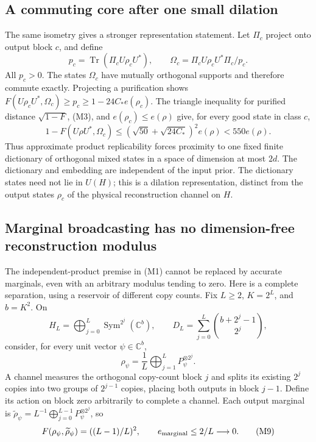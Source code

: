\documentclass[11pt]{article}
\newcommand{\Tr}{\operatorname{Tr}}
\begin{document}
\subsection{A commuting core after one small dilation}

The same isometry gives a stronger representation statement. Let $\Pi_c$ project onto output block $c$, and define
\[
p_c=\Tr(\Pi_cU\rho_cU^*),\qquad
\Omega_c=\Pi_cU\rho_cU^*\Pi_c/p_c.
\]
All $p_c>0$. The states $\Omega_c$ have mutually orthogonal supports and therefore commute exactly. Projecting a purification shows $F(U\rho_cU^*,\Omega_c)\ge p_c\ge1-24C_*e(\rho_c)$. The triangle inequality for purified distance $\sqrt{1-F}$, (M3), and $e(\rho_c)\le e(\rho)$ give, for every good state in class $c$,
\[
1-F(U\rho U^*,\Omega_c)
\le(\sqrt{50}+\sqrt{24C_*})^2e(\rho)<550e(\rho).
\tag{M8}
\]
Thus approximate product replicability forces proximity to one fixed finite dictionary of orthogonal mixed states in a space of dimension at most $2d$. The dictionary and embedding are independent of the input prior. The dictionary states need not lie in $U(H)$; this is a dilation representation, distinct from the output states $\rho_c$ of the physical reconstruction channel on $H$.

\subsection{Marginal broadcasting has no dimension-free reconstruction modulus}

The independent-product premise in (M1) cannot be replaced by accurate marginals, even with an arbitrary modulus tending to zero. Here is a complete separation, using a reservoir of different copy counts. Fix $L\ge2$, $K=2^L$, and $b=K^2$. On
\[
H_L=\bigoplus_{j=0}^L\operatorname{Sym}^{2^j}(\mathbb C^b),\qquad
D_L=\sum_{j=0}^L\binom{b+2^j-1}{2^j},
\]
consider, for every unit vector $\psi\in\mathbb C^b$,
\[
\rho_\psi=\frac1L\bigoplus_{j=1}^LP_\psi^{\otimes2^j}.
\]
A channel measures the orthogonal copy-count block $j$ and splits its existing $2^j$ copies into two groups of $2^{j-1}$ copies, placing both outputs in block $j-1$. Define its action on block zero arbitrarily to complete a channel. Each output marginal is
$\widetilde\rho_\psi=L^{-1}\bigoplus_{j=0}^{L-1}P_\psi^{\otimes2^j}$, so
\[
F(\rho_\psi,\widetilde\rho_\psi)=((L-1)/L)^2,
\qquad e_{\rm marginal}\le2/L\longrightarrow0.
\tag{M9}
\]
\end{document}
